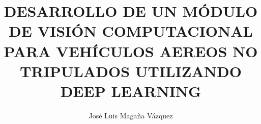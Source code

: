\documentclass[holdfloat]{MSC-TESO-01}
\begin{document}
\sloppy
\setlength{\baselineskip}{1\baselineskip}
\author{José Luis Magaña Vázquez}
\title{DESARROLLO DE UN MÓDULO DE VISIÓN COMPUTACIONAL PARA VEHÍCULOS AEREOS NO TRIPULADOS UTILIZANDO DEEP LEARNING}
\maketitle

%  
%
%
%
%
%


\setcounter{secnumdepth}{2} %
\setcounter{tocdepth}{2}    %
\tableofcontents            %


\listoffigures	%

\listoftables  %


\mainmatterSU




%
%
%

%

\end{document}
